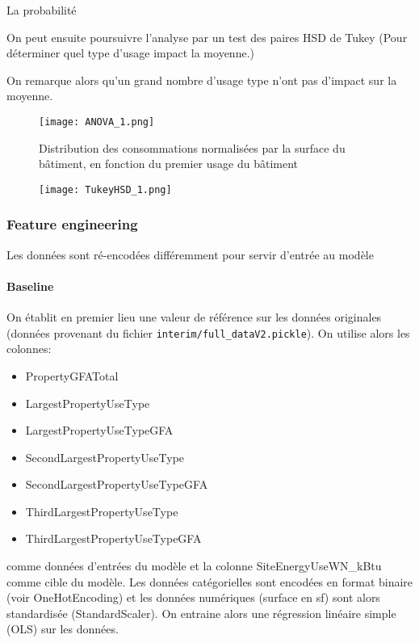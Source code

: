 La probabilité

On peut ensuite poursuivre l'analyse par
un test des paires HSD de Tukey \cite{abdi2020} (Pour déterminer quel type d'usage impact la moyenne.)

On remarque alors qu'un grand nombre d'usage type n'ont pas d'impact sur la moyenne.


\begin{figure*}
  \texttt{[image: ANOVA\_1.png]}
  \caption{Distribution des consommations normalisées par la surface du bâtiment,
           en fonction du premier usage du bâtiment}
  \label{}
\end{figure*}
\begin{figure*}
  \texttt{[image: TukeyHSD\_1.png]}
  \caption{}
  \label{}
\end{figure*}


\subsubsection{Feature engineering}

Les données sont ré-encodées différemment pour servir d'entrée au modèle

\paragraph{Baseline}
On établit en premier lieu une valeur de référence sur les données originales (données provenant
du fichier \Verb+interim/full_dataV2.pickle+).
On utilise alors les colonnes:
\begin{itemize}
  \item PropertyGFATotal
  \item LargestPropertyUseType
  \item LargestPropertyUseTypeGFA
  \item SecondLargestPropertyUseType
  \item SecondLargestPropertyUseTypeGFA
  \item ThirdLargestPropertyUseType
  \item ThirdLargestPropertyUseTypeGFA
\end{itemize}
comme données d'entrées du modèle et la colonne SiteEnergyUseWN\_kBtu comme cible
du modèle. Les données catégorielles sont encodées en format binaire (voir OneHotEncoding)
et les données numériques (surface en sf) sont alors standardisée (StandardScaler).
On entraine alors une régression linéaire simple (OLS) sur les données.


